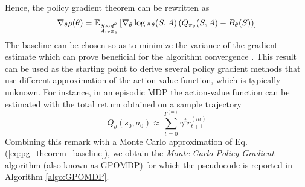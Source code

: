 Hence, the policy gradient theorem can be rewritten as 
\begin{equation}
\label{eq:pg_theorem_baseline}
	\nabla_\theta \rho(\theta) =
	\E[\substack{S \sim d^\theta\\A \sim \pi_\theta}]{\nabla_\theta\log
	\pi_\theta(S,A) \left(Q_{\pi_\theta}(S, A) - B_\theta(S)\right)}
\end{equation}
The baseline can be chosen so as to minimize the variance of the gradient estimate which can prove beneficial for the algorithm convergence \cite{peters2008reinforcement}. This result can be used as the starting point to derive several policy gradient methods that use different approximation of the action-value function, which is typically unknown. For instance, in an episodic MDP the action-value function can be estimated with the total return obtained on a sample trajectory
\begin{equation}
	Q_\theta(s_0,a_0) \approx \sum_{t=0}^{T^{(m)}} \gamma^t r_{t+1}^{(m)}
\end{equation}
Combining this remark with a Monte Carlo approximation of Eq. (\ref{eq:pg_theorem_baseline}), we obtain the \emph{Monte Carlo Policy Gradient} algorithm \cite{baxter2001infinite} (also known as GPOMDP) for which the pseudocode is reported in Algorithm \ref{algo:GPOMDP}.
